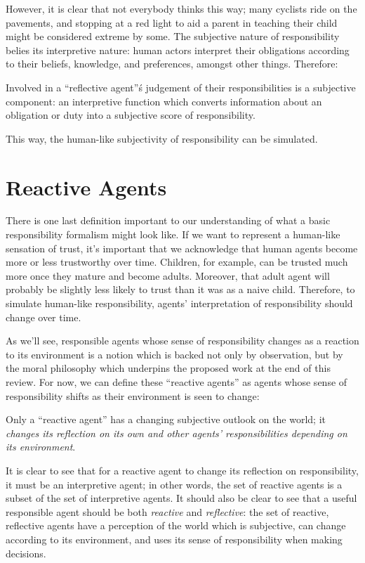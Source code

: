 However, it is clear that not everybody thinks this way; many cyclists ride on the pavements, and stopping at a red light to aid a parent in teaching their child might be considered extreme by some. The subjective nature of responsibility belies its interpretive nature: human actors interpret their obligations according to their beliefs, knowledge, and preferences, amongst other things. Therefore:
\begin{displayquote}
    Involved in a ``reflective agent''\'s judgement of their responsibilities is a subjective component: an interpretive function which converts information about an obligation or duty into a subjective score of responsibility.
\end{displayquote}\par

This way, the human-like subjectivity of responsibility can be simulated.

\section{Reactive Agents}
There is one last definition important to our understanding of what a basic responsibility formalism might look like. If we want to represent a human-like sensation of trust, it's important that we acknowledge that human agents become more or less trustworthy over time. Children, for example, can be trusted much more once they mature and become adults. Moreover, that adult agent will probably be slightly less likely to trust than it was as a naive child. Therefore, to simulate human-like responsibility, agents' interpretation of responsibility should change over time.\par

As we'll see, responsible agents whose sense of responsibility changes as a reaction to its environment is a notion which is backed not only by observation, but by the moral philosophy which underpins the proposed work at the end of this review. For now, we can define these ``reactive agents'' as agents whose sense of responsibility shifts as their environment is seen to change:
\begin{displayquote}
    Only a ``reactive agent'' has a changing subjective outlook on the world; it \emph{changes its reflection on its own and other agents' responsibilities depending on its environment}.
\end{displayquote}\par

It is clear to see that for a reactive agent to change its reflection on responsibility, it must be an interpretive agent; in other words, the set of reactive agents is a subset of the set of interpretive agents. It should also be clear to see that a useful responsible agent should be both \emph{reactive} and \emph{reflective}: the set of reactive, reflective agents have a perception of the world which is subjective, can change according to its environment, and uses its sense of responsibility when making decisions.

